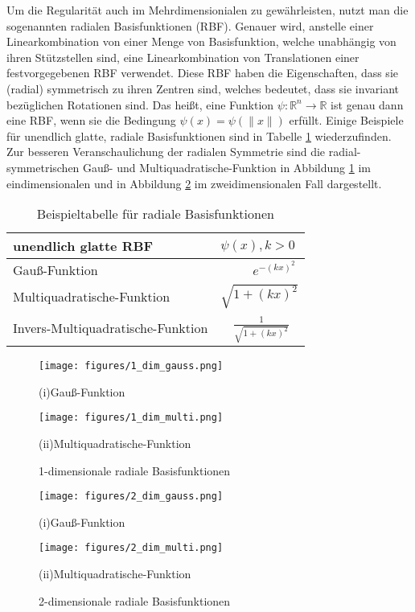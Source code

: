 \documentclass[a4paper,11pt]{article}
\begin{document}
Um die Regularität auch im Mehrdimensionialen zu gewährleisten, nutzt man die sogenannten radialen Basisfunktionen (RBF). Genauer wird, anstelle einer Linearkombination von einer Menge von Basisfunktion, welche unabhängig von ihren Stützstellen sind, eine Linearkombination von Translationen einer festvorgegebenen RBF verwendet. Diese RBF haben die Eigenschaften, dass sie (radial) symmetrisch zu ihren Zentren sind, welches bedeutet, dass sie invariant bezüglichen Rotationen sind. Das heißt, eine Funktion $\psi:\mathbb{R}^n\rightarrow\mathbb{R}$ ist genau dann eine RBF, wenn sie die Bedingung $\psi(x)=\psi(\|x\|)$ erfüllt. Einige Beispiele für unendlich glatte, radiale Basisfunktionen sind in Tabelle \ref{tbl:funktionstabelle} wiederzufinden. Zur besseren Veranschaulichung der radialen Symmetrie sind die radial-symmetrischen Gauß- und Multiquadratische-Funktion in Abbildung \ref{fig:RBF_1dim} im eindimensionalen und in Abbildung \ref{fig:RBF_2dim} im zweidimensionalen Fall dargestellt.
\begin{table}[H]
\centering
\begin{tabular}{|l|l|}
\hline
\textbf{unendlich glatte RBF}  & \textbf{$\psi(x), k>0$} \\
\hline
\rule{0pt}{15pt}Gauß-Funktion&~~~~~$e^{-(kx)^2}$\\
\rule{0pt}{15pt}Multiquadratische-Funktion& $\sqrt{1+(kx)^2}$\\
\rule{0pt}{15pt}Invers-Multiquadratische-Funktion&~~$\frac{1}{\sqrt{1+(kx)^2}}$\\
\hline
\end{tabular}
\caption{Beispieltabelle für radiale Basisfunktionen}
\label{tbl:funktionstabelle}
\end{table}
\begin{figure}[ht]
	\centering
\hspace{-1.4cm}
\begin{minipage}{0.45\textwidth}
	\texttt{[image: figures/1\_dim\_gauss.png]}
	\caption*{(i)Gauß-Funktion}
\end{minipage}
\hspace{0.5cm}
\begin{minipage}{0.45\textwidth}
	\texttt{[image: figures/1\_dim\_multi.png]}
	\caption*{(ii)Multiquadratische-Funktion}
\end{minipage}
	\caption{1-dimensionale radiale Basisfunktionen}
	\label{fig:RBF_1dim}
\end{figure}
\begin{figure}[ht]
	\centering
\hspace{-1.4cm}
\begin{minipage}{0.45\textwidth}
	\texttt{[image: figures/2\_dim\_gauss.png]}
	\caption*{(i)Gauß-Funktion}
\end{minipage}
\hspace{0.5cm}
\begin{minipage}{0.45\textwidth}
	\texttt{[image: figures/2\_dim\_multi.png]}
	\caption*{(ii)Multiquadratische-Funktion}
\end{minipage}
	\caption{2-dimensionale radiale Basisfunktionen}
	\label{fig:RBF_2dim}
\end{figure}
\end{document}
